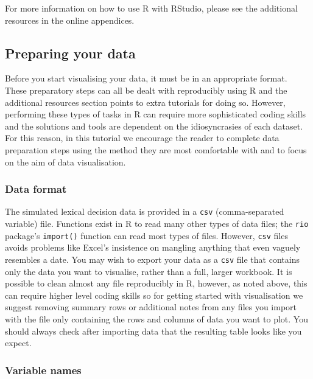 \documentclass[
  english,
  doc,floatsintext]{apa6}
\begin{document}
For more information on how to use R with RStudio, please see the additional resources in the online appendices.

\hypertarget{preparing-your-data}{%
\subsection{Preparing your data}\label{preparing-your-data}}

Before you start visualising your data, it must be in an appropriate format. These preparatory steps can all be dealt with reproducibly using R and the additional resources section points to extra tutorials for doing so. However, performing these types of tasks in R can require more sophisticated coding skills and the solutions and tools are dependent on the idiosyncrasies of each dataset. For this reason, in this tutorial we encourage the reader to complete data preparation steps using the method they are most comfortable with and to focus on the aim of data visualisation.

\hypertarget{data-format}{%
\subsubsection{Data format}\label{data-format}}

The simulated lexical decision data is provided in a \texttt{csv} (comma-separated variable) file. Functions exist in R to read many other types of data files; the \texttt{rio} package's \texttt{import()} function can read most types of files. However, \texttt{csv} files avoids problems like Excel's insistence on mangling anything that even vaguely resembles a date. You may wish to export your data as a \texttt{csv} file that contains only the data you want to visualise, rather than a full, larger workbook. It is possible to clean almost any file reproducibly in R, however, as noted above, this can require higher level coding skills so for getting started with visualisation we suggest removing summary rows or additional notes from any files you import with the file only containing the rows and columns of data you want to plot. You should always check after importing data that the resulting table looks like you expect.

\hypertarget{variable-names}{%
\subsubsection{Variable names}\label{variable-names}}
\end{document}
